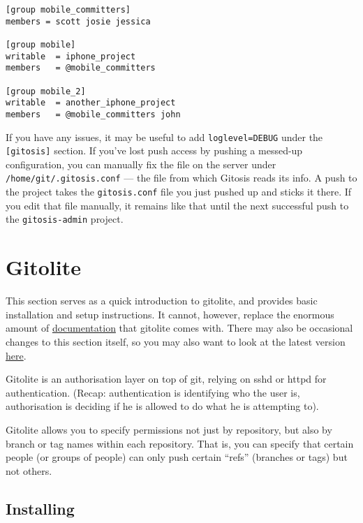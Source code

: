 \documentclass[a4paper]{book}
\newcounter{tab}[chapter]
\begin{document}
\begin{shaded}\begin{verbatim}
[group mobile_committers]
members = scott josie jessica

[group mobile]
writable  = iphone_project
members   = @mobile_committers

[group mobile_2]
writable  = another_iphone_project
members   = @mobile_committers john
\end{verbatim}\end{shaded}

If you have any issues, it may be useful to add \texttt{loglevel=DEBUG} under the \texttt{{[}gitosis{]}} section. If you've lost push access by pushing a messed-up configuration, you can manually fix the file on the server under \texttt{/home/git/.gitosis.conf} --- the file from which Gitosis reads its info. A push to the project takes the \texttt{gitosis.conf} file you just pushed up and sticks it there. If you edit that file manually, it remains like that until the next successful push to the \texttt{gitosis-admin} project.

\section{Gitolite}

This section serves as a quick introduction to gitolite, and provides basic installation and setup instructions. It cannot, however, replace the enormous amount of \href{http://sitaramc.github.com/gitolite/master-toc.html}{documentation} that gitolite comes with. There may also be occasional changes to this section itself, so you may also want to look at the latest version \href{http://sitaramc.github.com/gitolite/progit.html}{here}.

Gitolite is an authorisation layer on top of git, relying on sshd or httpd for authentication. (Recap: authentication is identifying who the user is, authorisation is deciding if he is allowed to do what he is attempting to).

Gitolite allows you to specify permissions not just by repository, but also by branch or tag names within each repository. That is, you can specify that certain people (or groups of people) can only push certain “refs” (branches or tags) but not others.

\subsection{Installing}
\end{document}
